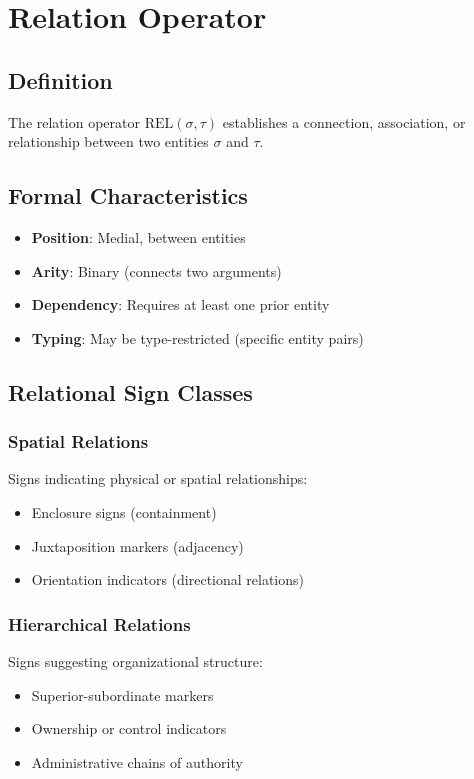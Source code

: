 \section{Relation Operator}

\subsection{Definition}

The relation operator $\text{REL}(\sigma, \tau)$ establishes a connection, association, or relationship between two entities $\sigma$ and $\tau$.

\subsection{Formal Characteristics}

\begin{itemize}
    \item \textbf{Position}: Medial, between entities
    \item \textbf{Arity}: Binary (connects two arguments)
    \item \textbf{Dependency}: Requires at least one prior entity
    \item \textbf{Typing}: May be type-restricted (specific entity pairs)
\end{itemize}

\subsection{Relational Sign Classes}

\subsubsection{Spatial Relations}
Signs indicating physical or spatial relationships:
\begin{itemize}
    \item Enclosure signs (containment)
    \item Juxtaposition markers (adjacency)
    \item Orientation indicators (directional relations)
\end{itemize}

\subsubsection{Hierarchical Relations}
Signs suggesting organizational structure:
\begin{itemize}
    \item Superior-subordinate markers
    \item Ownership or control indicators
    \item Administrative chains of authority
\end{itemize}

